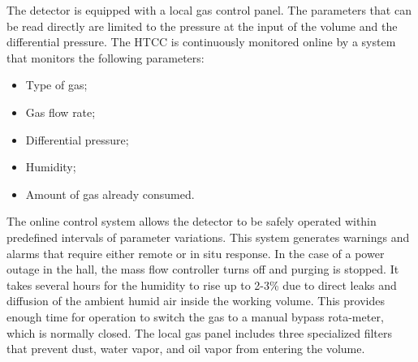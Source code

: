 The detector is equipped with a local gas control panel. The parameters that can be read directly are limited to the
pressure at the input of the volume and the differential pressure. The HTCC is continuously monitored online by a
system that monitors the following parameters:

\begin{itemize}
    \item Type of gas;
    \item Gas flow rate;
    \item Differential pressure;
    \item Humidity;
    \item Amount of gas already consumed.
\end{itemize}

The online control system allows the detector to be safely operated within predefined intervals of parameter
variations. This system generates warnings and alarms that require either remote or in situ response. In the case of
a power outage in the hall, the mass flow controller turns off and purging is stopped. It takes several hours for the
humidity to rise up to 2-3\% due to direct leaks and diffusion of the ambient humid air inside the working volume.
This provides enough time for operation to switch the gas to a manual bypass rota-meter, which is normally closed.
The local gas panel includes three specialized filters that prevent dust, water vapor, and oil vapor from entering
the volume.
